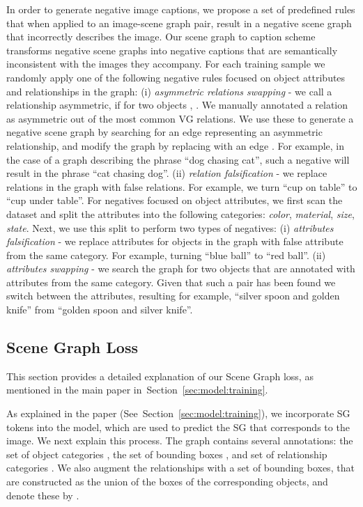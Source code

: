 \documentclass[11pt]{article}
\def\Secref#1{Section~\ref{#1}}
\def\Secref#1{Section~\ref{#1}}
\begin{document}
In order to generate negative image captions, we propose a set of predefined rules that when applied to an image-scene graph pair, result in a negative scene graph that incorrectly describes the image. Our scene graph to caption scheme transforms negative scene graphs into negative captions that are semantically inconsistent with the images they accompany. For each training sample we randomly apply one of the following negative rules focused on object attributes and relationships in the graph: (i) \textit{asymmetric relations swapping}  - we call a relationship  asymmetric, if for two objects , . We manually annotated a relation as asymmetric out of the  most common VG relations. We use these to generate a negative scene graph by searching for an edge  representing an asymmetric relationship, and modify the graph by replacing  with an edge . For example, in the case of a graph describing the phrase ``dog chasing cat'', such a negative will result in the phrase ``cat chasing dog''. (ii) \textit{relation falsification} - we replace relations in the graph with false relations. For example, we turn ``cup on table'' to ``cup under table''. For negatives focused on object attributes, we first scan the dataset and split the attributes into the following categories: \emph{color}, \emph{material}, \emph{size}, \emph{state}. Next, we use this split to perform two types of negatives: (i) \textit{attributes falsification} - we replace attributes for objects in the graph with false attribute from the same category. For example, turning ``blue ball'' to ``red ball''. (ii) \textit{attributes swapping} - we search the graph for two objects that are annotated with attributes from the same category. Given that such a pair has been found we switch between the attributes, resulting for example, ``silver spoon and golden knife'' from ``golden spoon and silver knife''. 





\subsection{Scene Graph Loss} 
\label{supp:models:sg_loss}

This section provides a detailed explanation of our Scene Graph loss, as mentioned in the main paper in~\Secref{sec:model:training}.

As explained in the paper (See~\Secref{sec:model:training}), we incorporate SG tokens into the model, which are used to predict the SG that corresponds to the image. We next explain this process. The graph  contains several annotations: the set of object categories , the set of bounding boxes , and set of relationship categories . We also augment the relationships with a set of bounding boxes, that are constructed as the union of the boxes of the corresponding objects, and denote these by . 
\end{document}
